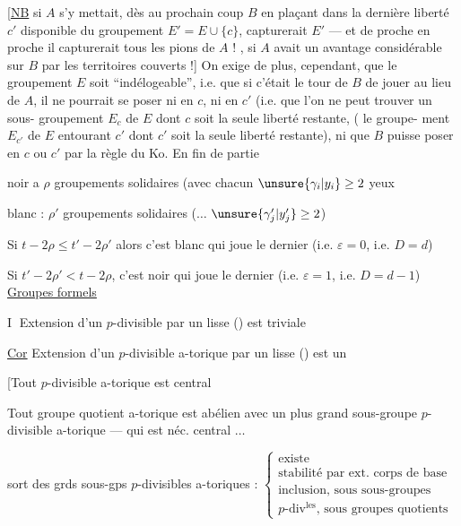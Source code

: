 [\uline{NB} si $A$ s'y mettait, dès au prochain coup
$B$ en  plaçant dans la  dernière liberté
$c'$ disponible du groupement $E'=E\cup\{c\}$, capturerait
$E'$ --- et de proche en proche il capturerait
tous les pions de $A$ !\deleted{\unsure{]}} ,  si $A$ avait
un avantage considérable sur $B$ par les
territoires couverts !] On exige de plus,
cependant, que le groupement $E$ soit
``indélogeable'', i.e. que si c'était le
tour de $B$ de jouer au lieu de $A$, il ne
pourrait se poser ni en $c$, ni en $c'$
(i.e. que l'on ne peut trouver un sous-
groupement $E_c$ de $E$  dont $c$ soit la
seule liberté  restante, (  le groupe-
ment $E_{c'}$ de $E$ entourant $c'$ dont $c'$ soit
la seule liberté restante), ni que $B$
puisse poser en $c$ ou $c'$ par la règle du
Ko.
En fin de partie

noir a $\rho$ groupements solidaires  (avec chacun
$\unsure{\gamma_i|y_i}\geq2$ yeux

blanc : $\rho'$ groupements solidaires  ($\ldots$ $\unsure{\gamma'_j|y'_j}\geq2$)


Si $t-2\rho\leq t'-2\rho'$
alors c'est blanc qui joue le dernier
(i.e. $\varepsilon=0$, i.e. $D=d$)

Si $t'-2\rho'<t-2\rho$,
c'est noir qui joue le dernier
(i.e. $\varepsilon=1$, i.e. $D=d-1$)
\uline{Groupes formels}

\textcircled{I} Extension d'un $p$-divisible par un lisse () est triviale

\uline{Cor} Extension d'un $p$-divisible a-torique par un lisse ()
est un  

[Tout  $p$-divisible a-torique est central

Tout groupe quotient  a-torique est abélien avec un
plus grand sous-groupe $p$-divisible a-torique
--- qui est néc. central $\ldots$

 sort des  grds sous-gps $p$-divisibles
a-toriques :
$\left\{\begin{array}{l}
\text{existe}\\
\text{stabilité par ext. corps de base}\\
\text{inclusion, sous sous-groupes}\\
\text{$p$-div$^{\mathrm{les}}$, sous groupes quotients}
\end{array}\right.$

